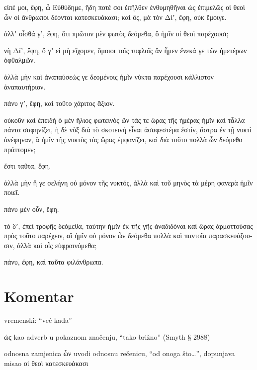 {\large

\begin{greek}

\noindent εἰπέ μοι, ἔφη, ὦ Εὐθύδημε, ἤδη ποτέ σοι ἐπῆλθεν ἐνθυμηθῆναι ὡς ἐπιμελῶς οἱ θεοὶ ὧν οἱ ἄνθρωποι δέονται κατεσκευάκασι; καὶ ὅς, μὰ τὸν Δίʼ, ἔφη, οὐκ ἔμοιγε. 

ἀλλʼ οἶσθά γʼ, ἔφη, ὅτι πρῶτον μὲν φωτὸς δεόμεθα, ὃ ἡμῖν οἱ θεοὶ παρέχουσι; 

νὴ Δίʼ, ἔφη, ὅ γʼ εἰ μὴ εἴχομεν, ὅμοιοι τοῖς τυφλοῖς ἂν ἦμεν ἕνεκά γε τῶν ἡμετέρων ὀφθαλμῶν. 

ἀλλὰ μὴν καὶ ἀναπαύσεώς γε δεομένοις ἡμῖν νύκτα παρέχουσι κάλλιστον ἀναπαυτήριον.

πάνυ γʼ, ἔφη, καὶ τοῦτο χάριτος ἄξιον. 

οὐκοῦν καὶ ἐπειδὴ ὁ μὲν ἥλιος φωτεινὸς ὢν τάς τε ὥρας τῆς ἡμέρας ἡμῖν καὶ τἆλλα πάντα σαφηνίζει, ἡ δὲ νὺξ διὰ τὸ σκοτεινὴ εἶναι ἀσαφεστέρα ἐστίν, ἄστρα ἐν τῇ νυκτὶ ἀνέφηναν, ἃ ἡμῖν τῆς νυκτὸς τὰς ὥρας ἐμφανίζει, καὶ διὰ τοῦτο πολλὰ ὧν δεόμεθα πράττομεν; 

ἔστι ταῦτα, ἔφη. 

ἀλλὰ μὴν ἥ γε σελήνη οὐ μόνον τῆς νυκτός, ἀλλὰ καὶ τοῦ μηνὸς τὰ μέρη φανερὰ ἡμῖν ποιεῖ.

πάνυ μὲν οὖν, ἔφη. 

τὸ δʼ, ἐπεὶ τροφῆς δεόμεθα, ταύτην ἡμῖν ἐκ τῆς γῆς ἀναδιδόναι καὶ ὥρας ἁρμοττούσας πρὸς τοῦτο παρέχειν, αἳ ἡμῖν οὐ μόνον ὧν δεόμεθα πολλὰ καὶ παντοῖα παρασκευάζουσιν, ἀλλὰ καὶ οἷς εὐφραινόμεθα;

πάνυ, ἔφη, καὶ ταῦτα φιλάνθρωπα.

\end{greek}

}


\section*{Komentar}


\begin{description}[noitemsep]
\item[ἤδη ποτέ] vremenski: “već kada”
\item[ὡς ἐπιμελῶς] ὡς kao adverb u pokaznom značenju, “tako brižno” (Smyth § 2988)
\item[ὧν οἱ ἄνθρωποι δέονται] odnosna zamjenica ὧν uvodi odnosnu rečenicu, “od onoga što\dots”, dopunjava misao οἱ θεοὶ κατεσκευάκασι
\end{description}

